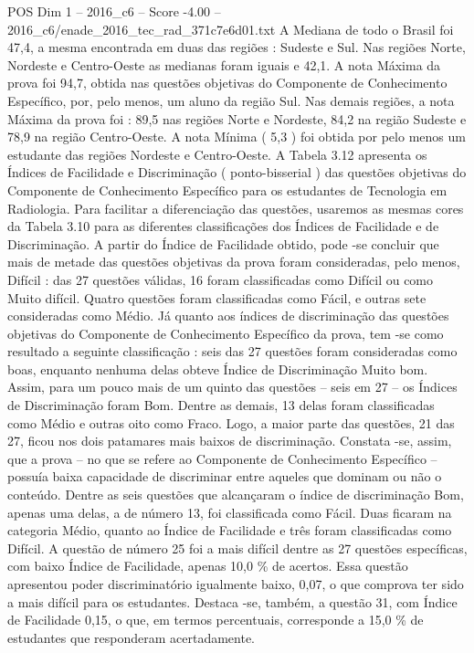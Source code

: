 \begin{textsample}{POS Dim 1 – 2016\_c6 – Score -4.00 – 2016\_c6/enade\_2016\_tec\_rad\_371c7e6d01.txt}
A Mediana de todo o Brasil foi 47,4, a mesma encontrada em duas das regiões : Sudeste e Sul.
Nas regiões Norte, Nordeste e Centro-Oeste as medianas foram iguais e 42,1.
A nota Máxima da prova foi 94,7, obtida nas questões objetivas do Componente de Conhecimento Específico, por, pelo menos, um aluno da região Sul.
Nas demais regiões, a nota Máxima da prova foi : 89,5 nas regiões Norte e Nordeste, 84,2 na região Sudeste e 78,9 na região Centro-Oeste.
A nota Mínima ( 5,3 ) foi obtida por pelo menos um estudante das regiões Nordeste e Centro-Oeste.
A Tabela 3.12 apresenta os Índices de Facilidade e Discriminação ( ponto-bisserial ) das questões objetivas do Componente de Conhecimento Específico para os estudantes de Tecnologia em Radiologia.
Para facilitar a diferenciação das questões, usaremos as mesmas cores da Tabela 3.10 para as diferentes classificações dos Índices de Facilidade e de Discriminação.
A partir do Índice de Facilidade obtido, pode -se concluir que mais de metade das questões objetivas da prova foram consideradas, pelo menos, Difícil : das 27 questões válidas, 16 foram classificadas como Difícil ou como Muito difícil.
Quatro questões foram classificadas como Fácil, e outras sete consideradas como Médio.
Já quanto aos índices de discriminação das questões objetivas do Componente de Conhecimento Específico da prova, tem -se como resultado a seguinte classificação : seis das 27 questões foram consideradas como boas, enquanto nenhuma delas obteve Índice de Discriminação Muito bom.
Assim, para um pouco mais de um quinto das questões – seis em 27 – os Índices de Discriminação foram Bom.
Dentre as demais, 13 delas foram classificadas como Médio e outras oito como Fraco.
Logo, a maior parte das questões, 21 das 27, ficou nos dois patamares mais baixos de discriminação.
Constata -se, assim, que a prova – no que se refere ao Componente de Conhecimento Específico – possuía baixa capacidade de discriminar entre aqueles que dominam ou não o conteúdo.
Dentre as seis questões que alcançaram o índice de discriminação Bom, apenas uma delas, a de número 13, foi classificada como Fácil.
Duas ficaram na categoria Médio, quanto ao Índice de Facilidade e três foram classificadas como Difícil.
A questão de número 25 foi a mais difícil dentre as 27 questões específicas, com baixo Índice de Facilidade, apenas 10,0 \% de acertos.
Essa questão apresentou poder discriminatório igualmente baixo, 0,07, o que comprova ter sido a mais difícil para os estudantes.
Destaca -se, também, a questão 31, com Índice de Facilidade 0,15, o que, em termos percentuais, corresponde a 15,0 \% de estudantes que responderam acertadamente.

\end{textsample}
